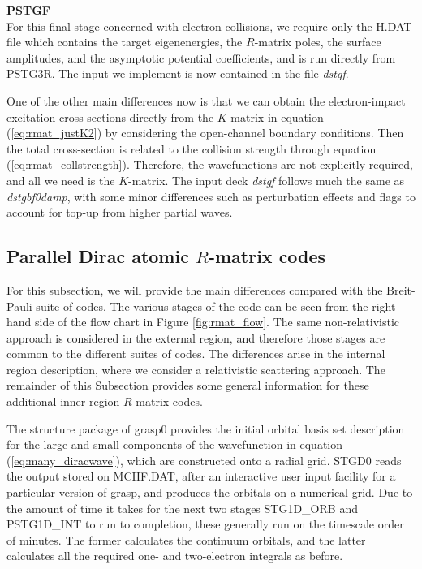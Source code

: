 \protect\textbf{PSTGF}\\
For this final stage concerned with electron collisions, we require only the H.DAT file which contains the target eigenenergies, the $R$-matrix poles, the surface amplitudes, and the asymptotic potential coefficients, and is run directly from PSTG3R. The input we implement is now contained in the file \textit{dstgf}.

One of the other main differences now is that we can obtain the electron-impact excitation cross-sections directly from the $K$-matrix in equation (\ref{eq:rmat_justK2}) by considering the open-channel boundary conditions. Then the total cross-section is related to the collision strength through equation (\ref{eq:rmat_collstrength}). Therefore, the wavefunctions are not explicitly required, and all we need is the $K$-matrix. The input deck \textit{dstgf} follows much the same as \textit{dstgbf0damp}, with some minor differences such as perturbation effects and flags to account for top-up from higher partial waves.

\subsection{Parallel Dirac atomic $R$-matrix codes}\label{ssec:DARC}
For this subsection, we will provide the main differences compared with the Breit-Pauli suite of codes. The various stages of the code can be seen from the right hand side of the flow chart in Figure \ref{fig:rmat_flow}. The same non-relativistic approach is considered in the external region, and therefore those stages are common to the different suites of codes. The differences arise in the internal region description, where we consider a relativistic scattering approach. The remainder of this Subsection provides some general information for these additional inner region $R$-matrix codes.

The structure package of {\sc grasp0} provides the initial orbital basis set description for the large and small components of the wavefunction in equation (\ref{eq:many_diracwave}), which are constructed onto a radial grid. STGD0 reads the output stored on MCHF.DAT, after an interactive user input facility for a particular version of {\sc grasp}, and produces the orbitals on a numerical grid. Due to the amount of time it takes for the next two stages STG1D\_ORB and PSTG1D\_INT to run to completion, these generally run on the timescale order of minutes. The former calculates the continuum orbitals, and the latter calculates all the required one- and two-electron integrals as before.


